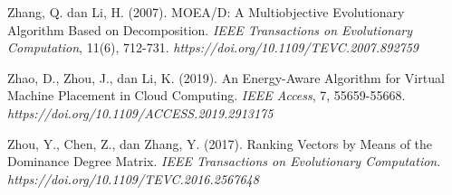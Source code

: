 \begin{thebibliography}{99}
	

	Zhang, Q. dan Li, H. (2007). MOEA/D: A Multiobjective Evolutionary Algorithm Based on Decomposition. \textit{IEEE Transactions on Evolutionary Computation}, 11(6), 712-731. \textit{https://doi.org/10.1109/TEVC.2007.892759}
	
	

	Zhao, D., Zhou, J., dan Li, K. (2019). An Energy-Aware Algorithm for Virtual Machine Placement in Cloud Computing. \textit{IEEE Access}, 7, 55659-55668. \textit{https://doi.org/10.1109/ACCESS.2019.2913175}
	
	

	Zhou, Y., Chen, Z., dan Zhang, Y. (2017). Ranking Vectors by Means of the Dominance Degree Matrix. \textit{IEEE Transactions on Evolutionary Computation}. \textit{https://doi.org/10.1109/TEVC.2016.2567648}
	
  
	
\end{thebibliography}
